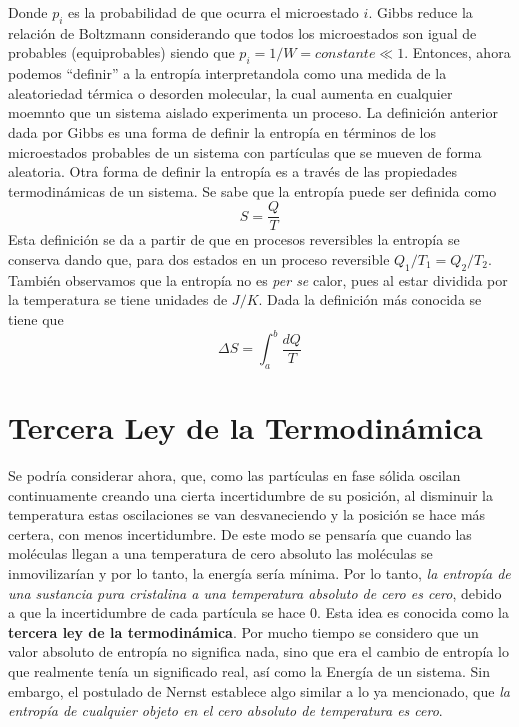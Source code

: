 Donde $p_i$ es la probabilidad de que ocurra el microestado $i$. Gibbs reduce la relación de Boltzmann considerando que todos los microestados son igual de probables (equiprobables) siendo que $p_i = 1/W = constante \ll 1$. Entonces, ahora podemos ``definir'' a la entropía interpretandola como una medida de la aleatoriedad térmica o desorden molecular, la cual aumenta en cualquier moemnto que un sistema aislado experimenta un proceso. La definición anterior dada por Gibbs es una forma de definir la entropía en términos de los microestados probables de un sistema con partículas que se mueven de forma aleatoria. Otra forma de definir la entropía es a través de las propiedades termodinámicas de un sistema. Se sabe que la entropía puede ser definida como
\begin{equation}
    S = \frac{Q}{T}
\end{equation}
Esta definición se da a partir de que en procesos reversibles la entropía se conserva dando que, para dos estados en un proceso reversible $Q_1/T_1 = Q_2/T_2$. También observamos que la entropía no es \emph{per se} calor, pues al estar dividida por la temperatura se tiene unidades de $J/K$. Dada la definición más conocida se tiene que
\begin{equation}
    \Delta S = \int_{a}^{b} \frac{dQ}{T}
\end{equation}

\section{Tercera Ley de la Termodinámica}
Se podría considerar ahora, que, como las partículas en fase sólida oscilan continuamente creando una cierta incertidumbre de su posición, al disminuir la temperatura estas oscilaciones se van desvaneciendo y la posición se hace más certera, con menos incertidumbre. De este modo se pensaría que cuando las moléculas llegan a una temperatura de cero absoluto las moléculas se inmovilizarían y por lo tanto, la energía sería mínima. Por lo tanto, \emph{la entropía de una sustancia pura cristalina a una temperatura absoluto de cero es cero}, debido a que la incertidumbre de cada partícula se hace 0. Esta idea es conocida como la \textbf{tercera ley de la termodinámica}. Por mucho tiempo se considero que un valor absoluto de entropía no significa nada, sino que era el cambio de entropía lo que realmente tenía un significado real, así como la Energía de un sistema. Sin embargo, el postulado de Nernst establece algo similar a lo ya mencionado, que \emph{la entropía de cualquier objeto en el cero absoluto de temperatura es cero}. 